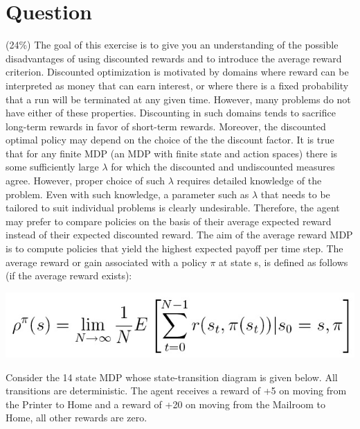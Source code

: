 \documentclass[10pt]{article}
\begin{document}
\section{Question} 
 (24\%) The goal of this exercise is to give you an understanding of the possible disadvantages of using discounted rewards and to introduce the average reward criterion. Discounted optimization is motivated by domains where reward can be interpreted as money that can earn interest, or where there is a fixed probability that a run will be terminated at any given time. However, many problems do not have either of these properties. Discounting in such domains tends to sacrifice long-term rewards in favor of short-term rewards. Moreover, the discounted optimal policy may depend on the choice of the the discount factor. It is true that for any finite MDP (an MDP with finite state and action spaces) there is some sufficiently large $\lambda$ for which the discounted and undiscounted measures agree. However, proper choice of such $\lambda$ requires detailed knowledge of the problem. Even with such knowledge, a parameter such as $\lambda$ that needs to be tailored to suit individual problems is clearly undesirable. Therefore, the agent may prefer to compare policies on the basis of their average expected reward instead of their expected discounted reward. The aim of the average reward MDP is to compute policies that yield the highest expected payoff per time step. The average reward or gain associated with a policy $\pi$ at state s, is defined as follows (if the average reward exists):

\begin{center}
 \includegraphics[scale=0.5]{hw6_files/fig6x1.jpg}
\end{center}


Consider the 14 state MDP whose state-transition diagram is given below. All transitions are deterministic. The agent receives a reward of +5 on moving from the Printer to Home and a reward of +20 on moving from the Mailroom to Home, all other rewards are zero.
\end{document}
